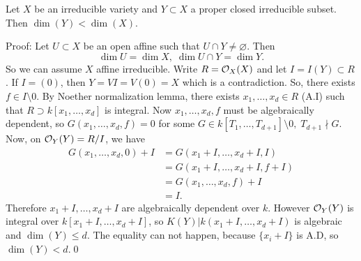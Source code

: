 \begin{dang}
\begin{proposition}\label{proposition: dimension of proper closed}
    Let $X$ be an irreducible variety and $Y\subset X$ a proper closed irreducible subset. Then 
    $\dim(Y)<\dim(X)$.
\end{proposition}
\end{dang}
Proof: Let $U\subset X$ be an open affine such that $U\cap Y\neq\varnothing$. Then 
\begin{equation}
    \dim U = \dim X,\; \dim U\cap Y = \dim Y.
\end{equation} 
So we can assume $X$ affine irreducible. Write $R=\mathcal{O}_X(X)$ and let $I=I(Y)\subset R$. 
If $I=(0)$, then $Y = VI = V(0)=X$ which is a contradiction. So, there exists $f\in I\setminus0$. By 
Noether normalization lemma, there exists $x_1,\dots, x_d\in R$ (A.I) such that $R\supset k[x_1,\dots,x_d]$
is integral. Now $x_1,\dots,x_d,f$ must be algebraically dependent, so $G(x_1,\dots,x_d,f)=0$ for some 
$G\in k[T_1,\dots,T_{d+1}]\setminus0,\; T_{d+1}\nmid G$. Now, on $\mathcal{O}_Y(Y)=R/I$, we have 
\begin{equation}
    \begin{split}
        G(x_1,\dots,x_d,0) + I &=G(x_1+I,\dots,x_d+I,I)\\
        &=G(x_1+I,\dots, x_d+I, f + I)\\
        &=G(x_1,\dots,x_d,f) +I\\
        &=I.
    \end{split}
\end{equation}
Therefore $x_1+I,\dots,x_d+I$ are algebraically dependent over $k$. However 
$\mathcal{O}_Y(Y)$ is integral over $k[x_1+I,\dots,x_d+I]$, so $K(Y)|k(x_1+I,\dots,x_d+I)$ is algebraic and 
$\dim(Y)\leq d$. The equality can not happen, because $\{x_i+I\}$ is A.D, so $\dim(Y)<d$.\qed 

